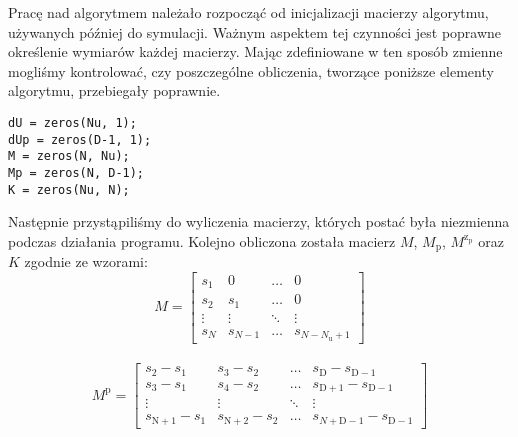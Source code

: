 Pracę nad algorytmem należało rozpocząć od inicjalizacji macierzy algorytmu, używanych później do symulacji. Ważnym aspektem tej czynności jest poprawne określenie wymiarów każdej macierzy. Mając zdefiniowane w ten sposób zmienne mogliśmy kontrolować, czy poszczególne obliczenia, tworzące poniższe elementy algorytmu, przebiegały poprawnie.
\\

\begin{lstlisting}[style=custommatlab,frame=single,label={zad4_sim_lst},caption={Definicja macierzy algorytmu DMC},captionpos=b]
dU = zeros(Nu, 1);
dUp = zeros(D-1, 1);
M = zeros(N, Nu);
Mp = zeros(N, D-1);
K = zeros(Nu, N);
\end{lstlisting}

Następnie przystąpiliśmy do wyliczenia macierzy, których postać była niezmienna podczas działania programu.
Kolejno obliczona została macierz $M$, $M_\mathrm{p}$, $M^{\mathrm{z}_{\mathrm{p}}}$ oraz $K$ zgodnie ze wzorami:
\\

\begin{equation}
M=\left[
\begin{array}
{cccc}
s_{1} & 0 & \ldots & 0\\
s_{2} & s_{1} & \ldots & 0\\
\vdots & \vdots & \ddots & \vdots\\
s_{N} & s_{N-1} & \ldots &  s_{N-N_{\mathrm{u}}+1}
\end{array}
\right]
\end{equation}
\\
\begin{equation}
M^{\mathrm{p}}=\left[
\begin{array}
{cccc}
s_{\mathrm{2}} - s_{\mathrm{1}} & s_{\mathrm{3}} - s_{\mathrm{2}} & \ldots & s_{\mathrm{D}} - s_{\mathrm{D-1}}\\
s_{\mathrm{3}} - s_{\mathrm{1}} & s_{\mathrm{4}} - s_{\mathrm{2}} & \ldots & s_{\mathrm{D+1}} - s_{\mathrm{D-1}}\\
\vdots & \vdots & \ddots & \vdots\\
s_{\mathrm{N+1}} - s_{1} & s_{\mathrm{N+2}} - s_{\mathrm{2}} & \ldots &  s_{N + \mathrm{D} - 1} - s_{{\mathrm{D-1}}}
\end{array}
\right]
\end{equation}

